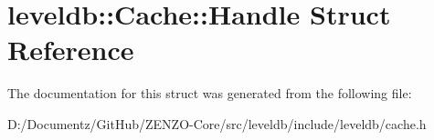 \hypertarget{structleveldb_1_1_cache_1_1_handle}{}\section{leveldb\+::Cache\+::Handle Struct Reference}
\label{structleveldb_1_1_cache_1_1_handle}


The documentation for this struct was generated from the following file\+:\begin{DoxyCompactItemize}
\item 
D\+:/\+Documentz/\+Git\+Hub/\+Z\+E\+N\+Z\+O-\/\+Core/src/leveldb/include/leveldb/cache.\+h\end{DoxyCompactItemize}
